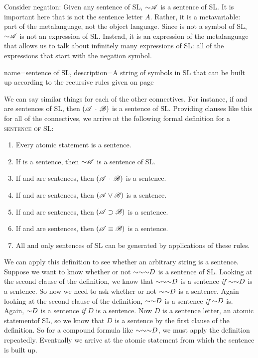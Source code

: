 Consider negation: Given any sentence  of SL, $\mathord{\sim}\mathscr{A}$ is a sentence of SL. It is important here that  is not the sentence letter $A$. Rather, it is a metavariable: part of the metalanguage, not the object language. Since  is not a symbol of SL, $\mathord{\sim}\mathscr{A}$ is not an expression of SL. Instead, it is an expression of the metalanguage that allows us to talk about infinitely many expressions of SL: all of the expressions that start with the negation symbol. 


{
name=sentence of SL,
description={A string of symbols in SL that can be built up according to the recursive rules given on page} %
}



We can say similar things for each of the other connectives. For instance, if  and  are sentences of SL, then $(\mathscr{A}\,\cdot\,\mathscr{B})$ is a sentence of SL. Providing clauses like this for all of the connectives, we arrive at the following formal definition for a \textsc{\gls{sentence of SL}}: \label{def:sentence_of_SL}

\begin{enumerate}
\item Every atomic statement is a sentence.
\item If  is a sentence, then $\mathord{\sim}\mathscr{A}$ is a sentence of SL.
\item If  and  are sentences, then $(\mathscr{A}\,\cdot\,\mathscr{B})$ is a sentence.
\item If  and  are sentences, then $(\mathscr{A}\vee\mathscr{B})$ is a sentence.
\item If  and  are sentences, then $(\mathscr{A}\supset\mathscr{B})$ is a sentence.
\item If  and  are sentences, then $(\mathscr{A}\equiv\mathscr{B})$ is a sentence.
\item All and only sentences of SL can be generated by applications of these rules.
\end{enumerate}

We can apply this definition to see whether an arbitrary string is a sentence. Suppose we want to know whether or not $\mathord{\sim} \mathord{\sim} \mathord{\sim} D$ is a sentence of SL. Looking at the second clause of the definition, we know that $\mathord{\sim} \mathord{\sim} \mathord{\sim} D$ is a sentence \emph{if} $\mathord{\sim} \mathord{\sim} D$ is a sentence. So now we need to ask whether or not $\mathord{\sim} \mathord{\sim} D$ is a sentence. Again looking at the second clause of the definition, $\mathord{\sim} \mathord{\sim} D$ is a sentence \emph{if} $\mathord{\sim} D$ is. Again, $\mathord{\sim} D$ is a sentence \emph{if} $D$ is a sentence. Now $D$ is a sentence letter, an atomic statementof SL, so we know that $D$ is a sentence by the first clause of the definition. So for a compound formula like $\mathord{\sim} \mathord{\sim} \mathord{\sim} D$, we must apply the definition repeatedly. Eventually we arrive at the atomic statement from which the sentence is built up.


